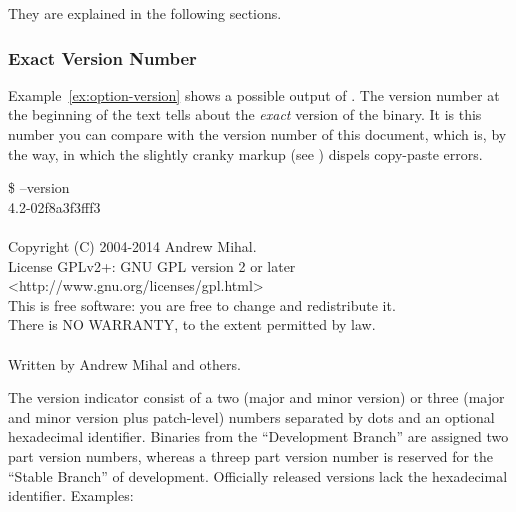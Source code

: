 \noindent They are explained in the following sections.

\subsubsection[Exact Version]{Exact Version Number
  \label{sec:exact-version}
  }

Example~\ref{ex:option-version} shows a possible output of
.  The version number at the beginning of the
text tells about the \emph{exact} version of the binary.  It is this
number you can compare with the version number of this document, which
is, by the way,  in which the slightly cranky markup
(see ) dispels copy-paste errors.

\begin{exemplar}[htbp]
  \centering
  \begin{terminal}
    \$ \app{} --version \\
    \app{} 4.2-02f8a3f3fff3 \\
    ~ \\
    Copyright (C) 2004-2014 Andrew Mihal. \\
    License GPLv2+: GNU GPL version 2 or later <http://www.gnu.org/licenses/gpl.html> \\
    This is free software: you are free to change and redistribute it. \\
    There is NO WARRANTY, to the extent permitted by law. \\
    ~ \\
    Written by Andrew Mihal and others.
  \end{terminal}

  \caption[Output of ]%
          {Example output of \appcmd{} when called with
            option~.\label{ex:option-version}}
\end{exemplar}

The version indicator consist of a two (major and minor version) or
three (major and minor version plus patch-level) numbers separated by
dots and an optional hexadecimal identifier.  Binaries from the
``Development Branch''%
 are assigned two part
version numbers, whereas a threep part version number is reserved for
the ``Stable Branch''%
 of development.  Officially
released versions lack the hexadecimal identifier.  Examples:

